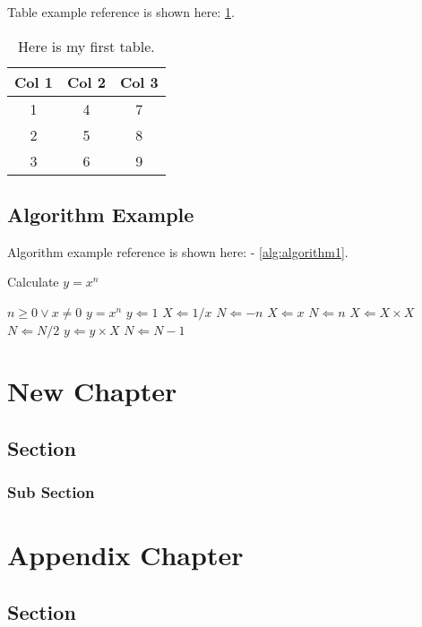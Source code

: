 \documentclass[12pt]{book}
\begin{document}
\noindent Table example reference is shown here: \cref{tab:mytable}.

\begin{table}[h!]
  \centering
  \begin{tabular}{ccc}
  \hline
  \textbf{Col 1} & \textbf{Col 2} & \textbf{Col 3} \\ \hline
  1              & 4              & 7              \\ \hline
  2              & 5              & 8              \\ \hline
  3              & 6              & 9              \\ \hline
  \end{tabular}
  \caption{Here is my first table.}
  \label{tab:mytable}
\end{table}

\newpage
\section{Algorithm Example}

\noindent Algorithm example reference is shown here: - \cref{alg:algorithm1}. 

\begin{algorithm} %
  \caption{Calculate $y = x^n$} %
  \label{alg:algorithm1} %
  \begin{algorithmic} %
      \REQUIRE $n \geq 0 \vee x \neq 0$
      \ENSURE $y = x^n$
      \STATE $y \Leftarrow 1$
          \STATE $X \Leftarrow 1 / x$
          \STATE $N \Leftarrow -n$
      \ELSE
          \STATE $X \Leftarrow x$
          \STATE $N \Leftarrow n$
      \ENDIF
              \STATE $X \Leftarrow X \times X$
              \STATE $N \Leftarrow N / 2$
          \ELSE[$N$ is odd]
              \STATE $y \Leftarrow y \times X$
              \STATE $N \Leftarrow N - 1$
          \ENDIF
      \ENDWHILE
  \end{algorithmic}
\end{algorithm}

\chapter{New Chapter}

\section{Section}
\subsection{Sub Section}


\appendix

\chapter{Appendix Chapter}

\section{Section}
\end{document}
